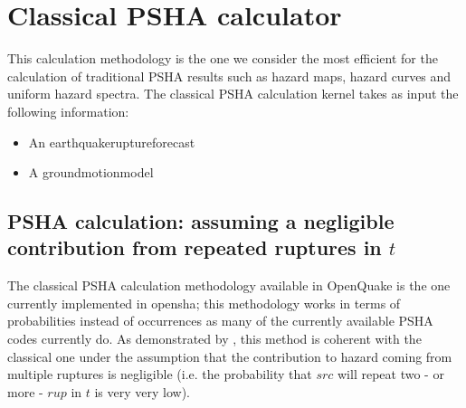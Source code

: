 \section{Classical PSHA calculator}
\label{chap:classic_psha}
%
This calculation methodology is the one we consider the most efficient 
for the calculation of traditional PSHA results such as hazard maps,
hazard curves and uniform hazard spectra.
%
The classical PSHA calculation kernel \citep{field2003} takes as 
input the following information: 
%
\begin{itemize}
\item An \gls{earthquakeruptureforecast} 
\item A \gls{groundmotionmodel} 
\end{itemize}
%
\subsection{PSHA calculation: assuming a negligible contribution from 
repeated ruptures in $t$}
%
The classical PSHA calculation methodology available in OpenQuake 
is the one currently implemented in \gls{opensha}; this methodology
works in terms of probabilities instead of occurrences as many of 
the currently available PSHA codes currently do. 
%
As demonstrated by \citet{field2003}, this method is coherent 
with the classical one under the assumption that the contribution 
to hazard coming from multiple ruptures is negligible (i.e. 
the probability that $src$ will repeat two - or more - $rup$ in $t$ 
is very very low). 

